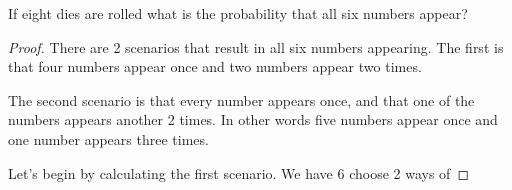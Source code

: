 \documentclass[11pt]{article}
\newenvironment{problem}[2][Problem\!]{\begin{trivlist}
\item[\hskip \labelsep {\bfseries #1}\hskip \labelsep {\bfseries #2}]}{\end{trivlist}}
\begin{document}
\newpage
\begin{tcolorbox}
    \begin{problem} {IC | 11/03 | 122}
        If eight dies are rolled what is the probability that all six numbers appear?
    \end{problem}
\end{tcolorbox}
\begin{proof}
    There are 2 scenarios that result in all six numbers appearing. The first is that four numbers appear once and two numbers appear two times. 

    The second scenario is that every number appears once, and that one of the numbers appears another 2 times. In other words five numbers appear once and one number appears three times. 

    Let's begin by calculating the first scenario. We have 6 choose 2 ways of 
\end{proof}
\end{document}
